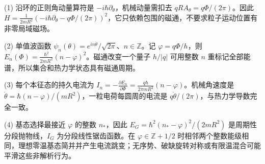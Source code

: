 (1) 沿环的正则角动量算符是 \(-i\hbar\partial_\theta\)，机械动量需扣去 \(qRA_\theta=q\Phi/(2\pi)\)。因此 \(\boxed{H=\frac1{2mR^2}(-i\hbar\partial_\theta-q\Phi/(2\pi))^2}\)，它只依赖包围的磁通，不要求粒子运动位置有非零局域磁场。

(2) 单值波函数 \(\psi_n(\theta)=e^{in\theta}/\sqrt{2\pi}\)、\(n\in\mathbb Z\)。记 \(\varphi=q\Phi/h\)，则 \(\boxed{E_n(\Phi)=\frac{\hbar^2}{2mR^2}(n-\varphi)^2}\)。磁通改变一个量子 \(h/|q|\) 可用整数 \(n\) 重标记全部能谱，所以集合和热力学状态具有磁通周期。

(3) 每个本征态的持久电流为 \(\boxed{I_n=-\frac{\partial E_n}{\partial\Phi}=\frac{q\hbar}{2\pi mR^2}(n-\varphi)}\)。机械角速度是 \(\dot\theta=\hbar(n-\varphi)/(mR^2)\)，一粒电荷每圆周的电流是 \(q\dot\theta/(2\pi)\)，与热力学导数完全一致。

(4) 基态选择最接近 \(\varphi\) 的整数 \(n_*\)，因此 \(E_G=\hbar^2(n_*-\varphi)^2/(2mR^2)\) 是周期性分段抛物线，\(I_G\) 为分段线性锯齿函数。在 \(\varphi\in\mathbb Z+1/2\) 时相邻两个整数能级相同，理想零温基态简并并产生电流跳变；无序势、破缺旋转对称或有限温混合可能平滑这些非解析行为。
